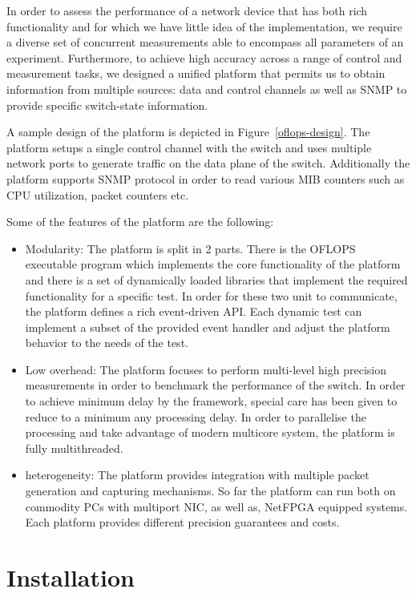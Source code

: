 \documentclass{book}
\begin{document}
In order to assess the performance of a network device that has both
rich functionality and for which we have little idea of the
implementation, we require a diverse set of concurrent measurements
able to encompass all parameters of an experiment. Furthermore,
to achieve high accuracy across a range of control and measurement
tasks, we designed a unified platform that permits us to obtain
information from multiple sources: data and control channels as well
as SNMP to provide specific switch-state information.

A sample design of the platform is
depicted in Figure~\ref{oflops-design}. The platform setups a single control
channel with the switch and uses multiple network ports to generate traffic on
the data plane of the switch. Additionally the platform supports SNMP protocol
in order to read various MIB counters such as CPU utilization, packet counters
etc. 

Some of the features of the platform are the following:
\begin{itemize}
    \item Modularity: The platform is split in 2 parts. There is the OFLOPS executable
        program which implements the core functionality of the platform and there is a
        set of dynamically loaded libraries that implement the required functionality
        for a specific test. In order for these two unit to communicate, the platform
        defines a rich event-driven API. Each dynamic test can implement a subset of the
        provided event handler and adjust the platform behavior to the needs of the
        test.
    \item Low overhead: The platform focuses to perform multi-level high precision
        measurements in order to benchmark the performance of the switch. In order to
        achieve minimum delay by the framework, special care has been given to reduce to
        a minimum any processing delay. In order to parallelise the processing and
        take advantage of modern multicore system, the platform is fully multithreaded.  
    \item heterogeneity: The platform provides integration with multiple packet
        generation and capturing mechanisms. So far the platform can run both on commodity
        PCs with multiport NIC, as well as, NetFPGA equipped systems. Each platform
        provides different precision guarantees and costs. 
\end{itemize}

\chapter{Installation}
\end{document}
